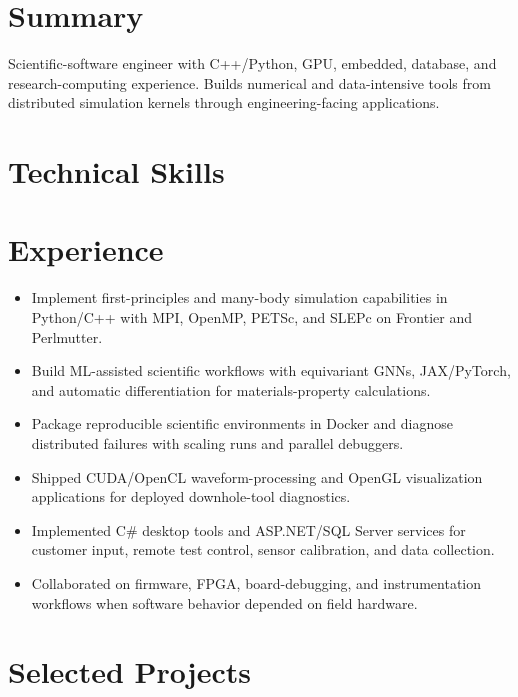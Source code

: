 \section{Summary}
Scientific-software engineer with C++/Python, GPU, embedded, database, and research-computing experience. Builds numerical and data-intensive tools from distributed simulation kernels through engineering-facing applications.
\section{Technical Skills}
\section{Experience}
\begin{itemize}
\item Implement first-principles and many-body simulation capabilities in Python/C++ with MPI, OpenMP, PETSc, and SLEPc on Frontier and Perlmutter.
\item Build ML-assisted scientific workflows with equivariant GNNs, JAX/PyTorch, and automatic differentiation for materials-property calculations.
\item Package reproducible scientific environments in Docker and diagnose distributed failures with scaling runs and parallel debuggers.
\end{itemize}
\begin{itemize}
\item Shipped CUDA/OpenCL waveform-processing and OpenGL visualization applications for deployed downhole-tool diagnostics.
\item Implemented C\# desktop tools and ASP.NET/SQL Server services for customer input, remote test control, sensor calibration, and data collection.
\item Collaborated on firmware, FPGA, board-debugging, and instrumentation workflows when software behavior depended on field hardware.
\end{itemize}
\section{Selected Projects}

